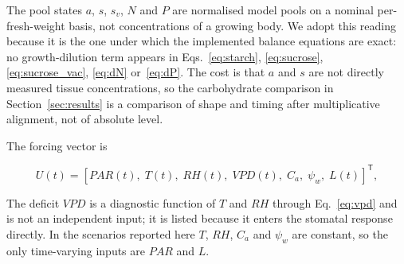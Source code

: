 The pool states $a$, $s$, $s_v$, $N$ and $P$ are normalised model pools on a
nominal per-fresh-weight basis, not concentrations of a growing body. We adopt
this reading because it is the one under which the implemented balance equations
are exact: no growth-dilution term appears in Eqs.~\eqref{eq:starch},
\eqref{eq:sucrose}, \eqref{eq:sucrose_vac}, \eqref{eq:dN} or~\eqref{eq:dP}. The
cost is that $a$ and $s$ are not directly measured tissue concentrations, so the
carbohydrate comparison in Section~\ref{sec:results} is a comparison of shape and
timing after multiplicative alignment, not of absolute level.

The forcing vector is

\begin{equation}
U(t) =
\left[
\mathit{PAR}(t),\; T(t),\; \mathit{RH}(t),\; \mathit{VPD}(t),\; C_a,\;
\psi_w,\; L(t)
\right]^{\mathsf{T}},
\label{eq:input_vector}
\end{equation}

The deficit $\mathit{VPD}$ is a diagnostic function of $T$ and $\mathit{RH}$
through Eq.~\eqref{eq:vpd} and is not an independent input; it is listed because it
enters the stomatal response directly. In the scenarios reported here $T$,
$\mathit{RH}$, $C_a$ and $\psi_w$ are constant, so the only time-varying inputs are
$\mathit{PAR}$ and $L$.

